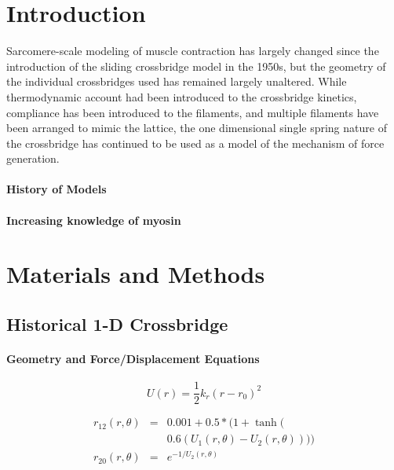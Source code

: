 \documentclass[11pt]{article}
\begin{document}
\begin{multicols}{2}



\section*{Introduction}

Sarcomere-scale modeling of muscle contraction has largely changed since the introduction of the sliding crossbridge model in the 1950s, but the geometry of the individual crossbridges used has remained largely unaltered. While thermodynamic account had been introduced to the crossbridge kinetics, compliance has been introduced to the filaments, and multiple filaments have been arranged to mimic the lattice, the one dimensional single spring nature of the crossbridge has continued to be used as a model of the mechanism of force generation.

\paragraph*{History of Models}

\paragraph*{Increasing knowledge of myosin}



\section*{Materials and Methods}

\subsection*{Historical 1-D Crossbridge}
\paragraph*{Geometry and Force/Displacement Equations}

\begin{equation}
U(r)=\frac{1}{2}k_r (r-r_0)^2
\end{equation}

\begin{eqnarray}  
	r_{12}(r, \theta) & = & 0.001 + 0.5 * (1 + \tanh( \nonumber \\
				&   & 0.6 (U_1(r, \theta) - U_2(r, \theta)))) \\
	r_{20}(r, \theta) & = & e^{-1 / U_2(r, \theta)}
\end{eqnarray} 
 

\end{multicols}
\end{document}
